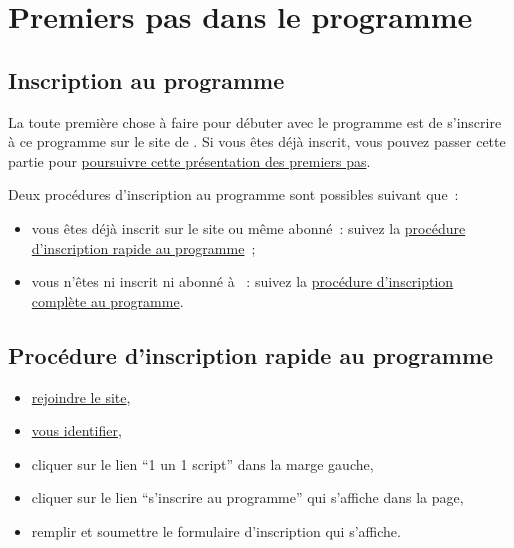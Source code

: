 % 
% 
% 
% 
% 
% 
% 
% 

\section{Premiers pas dans le programme}\hypertarget{premiers-pas}{}\label{premiers-pas}

\subsection{Inscription au programme}\hypertarget{inscription-programme}{}\label{inscription-programme}

La toute première chose à faire pour débuter avec le programme \unan{} est de s'inscrire à ce programme sur le site de \boa{}. Si vous êtes déjà inscrit, vous pouvez passer cette partie pour \hyperlink{premiers-pas-apres-inscription}{poursuivre cette présentation des premiers pas}.

Deux procédures d'inscription au programme sont possibles suivant que~{}:

\begin{itemize}
\item vous êtes déjà inscrit sur le site ou même abonné~{}: suivez la \hyperlink{procedure-inscription-rapide}{procédure d'inscription rapide au programme}~{};
\item vous n'êtes ni inscrit ni abonné à \boa{}~{}: suivez la \hyperlink{procedure-inscription-complete}{procédure d'inscription complète au programme}.
\end{itemize}

\subsection{Procédure d'inscription rapide au programme}\hypertarget{procedure-inscription-rapide}{}\label{procedure-inscription-rapide}

\begin{itemize}
\item \hyperlink{rejoindre-site}{rejoindre le site},
\item \hyperlink{vous-identifier}{vous identifier},
\item cliquer sur le lien ``1 un 1 script'' dans la marge gauche,
\item cliquer sur le lien ``s'inscrire au programme'' qui s'affiche dans la page,
\item remplir et soumettre le formulaire d'inscription qui s'affiche.
\end{itemize}

